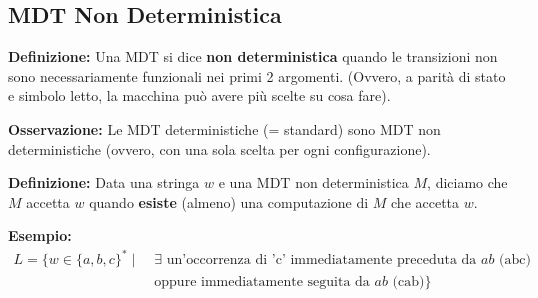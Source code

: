\vspace{0.8cm}
\subsection{MDT Non Deterministica}

\textbf{Definizione:} Una MDT si dice \textbf{non deterministica} quando le transizioni non sono necessariamente funzionali nei primi 2 argomenti. (Ovvero, a parità di stato e simbolo letto, la macchina può avere più scelte su cosa fare).

\vspace{0.4cm}
\textbf{Osservazione:} Le MDT deterministiche (= standard) sono MDT non deterministiche (ovvero, con una sola scelta per ogni configurazione).

\vspace{0.4cm}
\textbf{Definizione:} Data una stringa $w$ e una MDT non deterministica $M$, diciamo che $M$ accetta $w$ quando \textbf{esiste} (almeno) una computazione di $M$ che accetta $w$.
\begin{center}
\end{center}

\vspace{0.4cm}
\textbf{Esempio:} 
\begin{align*}
    L = \{w \in \{a,b,c\}^* \mid \;& \exists \text{ un'occorrenza di 'c' immediatamente preceduta da } ab \text{ (abc)} \\
    &\text{oppure immediatamente seguita da } ab \text{ (cab)}\}
\end{align*}


